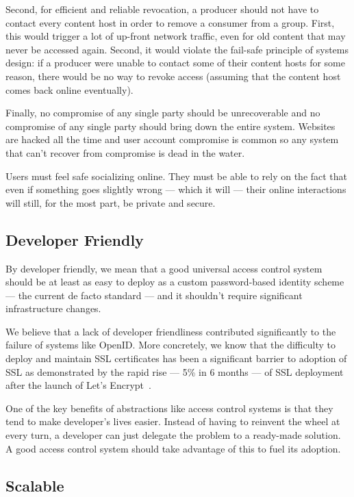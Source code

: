 \documentclass[pdftex,12pt,a4papaer,twoside,notitlepage]{report}
\begin{document}
Second, for efficient and reliable revocation, a producer should not have to
contact every content host in order to remove a consumer from a group. First,
this would trigger a lot of up-front network traffic, even for old content that
may never be accessed again. Second, it would violate the fail-safe principle of
systems design: if a producer were unable to contact some of their content hosts
for some reason, there would be no way to revoke access (assuming that the
content host comes back online eventually).

Finally, no compromise of any single party should be unrecoverable and no
compromise of any single party should bring down the entire system. Websites are
hacked all the time and user account compromise is common so any system that
can't recover from compromise is dead in the water.

Users must feel safe socializing online. They must be able to rely on the fact
that even if something goes slightly wrong --- which it will --- their online
interactions will still, for the most part, be private and secure.

\subsection{Developer Friendly}
\label{sec:goal-developer}

By developer friendly, we mean that a good universal access control system
should be at least as easy to deploy as a custom password-based identity scheme
--- the current de facto standard --- and it shouldn't require significant
infrastructure changes.

We believe that a lack of developer friendliness contributed significantly to
the failure of systems like OpenID\cite{openid}. More concretely, we know that
the difficulty to deploy and maintain SSL certificates has been a significant
barrier to adoption of SSL as demonstrated by the rapid rise --- 5\% in 6 months
--- of SSL deployment after the launch of Let's Encrypt~\cite{lets-encrypt}.

One of the key benefits of abstractions like access control systems is that they
tend to make developer's lives easier. Instead of having to reinvent the wheel
at every turn, a developer can just delegate the problem to a ready-made
solution. A good access control system should take advantage of this to fuel its
adoption.

\subsection{Scalable}
\end{document}
